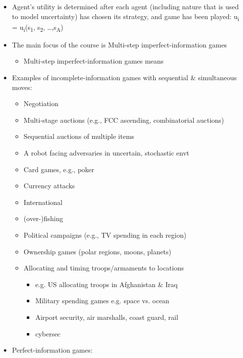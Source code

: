 \documentclass[
]{article}
\begin{document}
\begin{itemize}
\item
  Agent's utility is determined after each agent (including nature that
  is used to model uncertainty) has chosen its strategy, and game has
  been played: u\textsubscript{i} =
  u\textsubscript{i}(s\textsubscript{1}, s\textsubscript{2},
  \ldots,s\textsubscript{\textbar A\textbar{}})
\item
  The main focus of the course is Multi-step imperfect-information games

  \begin{itemize}
  \item
    Multi-step imperfect-information games means
  \end{itemize}
\item
  Examples of incomplete-information games with sequential \&
  simultaneous moves:

  \begin{itemize}
  \item
    Negotiation
  \item
    Multi-stage auctions (e.g., FCC ascending, combinatorial auctions)
  \item
    Sequential auctions of multiple items
  \item
    A robot facing adversaries in uncertain, stochastic envt
  \item
    Card games, e.g., poker
  \item
    Currency attacks
  \item
    International
  \item
    (over-)fishing
  \item
    Political campaigns (e.g., TV spending in each region)
  \item
    Ownership games (polar regions, moons, planets)
  \item
    Allocating and timing troops/armaments to locations

    \begin{itemize}
    \item
      e.g. US allocating troops in Afghanistan \& Iraq
    \item
      Military spending games e.g. space vs. ocean
    \item
      Airport security, air marshalls, coast guard, rail
    \item
      cybersec
    \end{itemize}
  \end{itemize}
\item
  Perfect-information games:


\end{itemize}
\end{document}
